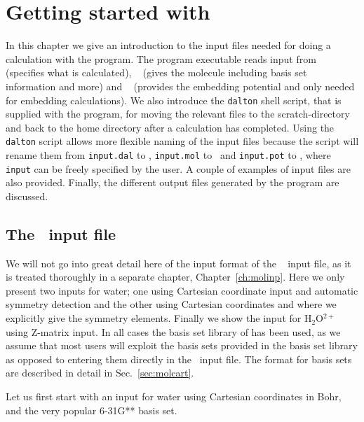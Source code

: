 \chapter{Getting started with {\dalton}}\label{ch:starting}

In this chapter we give an introduction to the input files needed
for doing a calculation with the {\dalton} program. The program executable reads input
from \dalinp\  (specifies what is calculated), \molinp\  (gives
the molecule including basis set information and more) and \potinp\  (provides the embedding potential and only needed for
embedding calculations). We also introduce the \verb|dalton| shell script,
that is supplied with the program, for moving the relevant files to the
scratch-directory and back to the home directory after a calculation has completed.
Using the \verb|dalton| script allows more flexible naming of the input files because the script will rename them from \verb|input.dal| to \dalinp, \verb|input.mol| to \molinp\ and \verb|input.pot| to \potinp, where \verb|input| can be freely specified by the user.
A couple of examples of input files are also provided. Finally, the different output
files generated by the program are discussed.

\section{The \molinp\ input file}

We will not go into great detail here of the input format of the \molinp\  input
file, as it is treated thoroughly in a separate chapter,
Chapter~\ref{ch:molinp}. Here we only present two inputs for
water; one
using Cartesian coordinate input and
automatic symmetry detection and
the other using Cartesian coordinates and where we explicitly give the
symmetry elements. Finally we show the input for H$_{2}$O$^{2+}$
using Z-matrix input. In
all cases the basis set library of {\dalton} has been used, as we
assume that most users will exploit the basis sets provided in the basis
set library as opposed to entering them directly in the \molinp\ input file. The format for basis sets are described in detail in Sec.~\ref{sec:molcart}.

Let us first start with an input for water using Cartesian coordinates
in Bohr, and the very popular 6-31G** basis set.

